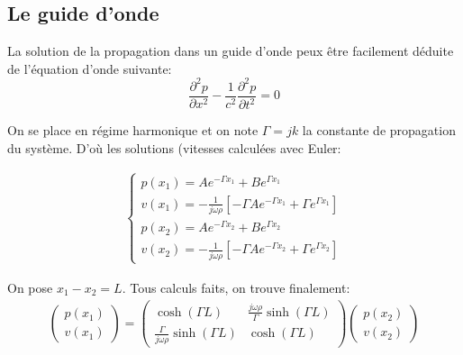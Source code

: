 \documentclass[a4paper]{report}
\begin{document}
\subsection{Le guide d'onde}
La solution de la propagation dans un guide d'onde peux être facilement déduite de l'équation d'onde suivante:
\begin{equation}
\frac{\partial ^2 p}{\partial x^2} -\frac{1}{c^{2}} \frac{\partial ^2 p}{\partial t^2}= 0
\end{equation}

On se place en régime harmonique et on note $\Gamma = jk$ la constante de propagation du système. D’où les solutions (vitesses calculées avec Euler:

\begin{eqnarray*}
\begin{cases}
p(x_1)  =  A e^{-\Gamma x_1} + B e^{\Gamma x_1} \\
v(x_1)  =  -\frac{1}{j\omega\rho} [ -\Gamma A e^{-\Gamma x_1} + \Gamma e^{\Gamma x_1}]\\
p(x_2)  =  A e^{-\Gamma x_2} + B e^{\Gamma x_2} \\
v(x_2)  =  -\frac{1}{j\omega\rho} [ -\Gamma A e^{-\Gamma x_2} + \Gamma e^{\Gamma x_2}]
\end{cases}
\end{eqnarray*}
 
On pose $x_1 - x_2 = L$. Tous calculs faits, on trouve finalement:
\begin{eqnarray*}
\begin{pmatrix} p(x_1) \\ v(x_1) \end{pmatrix} = \begin{pmatrix} \cosh(\Gamma L) & \frac{j\omega\rho}{\Gamma} \sinh(\Gamma L) \\  \frac{\Gamma}{j\omega\rho}\sinh(\Gamma L) & \cosh(\Gamma L) \end{pmatrix} \begin{pmatrix} p(x_2) \\ v(x_2) \end{pmatrix}
\end{eqnarray*}


\end{document}
